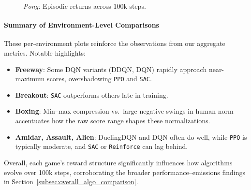 \begin{figure} 
	\centering
	\quad
	\caption{\emph{Pong:} Episodic returns across 100k steps.}
	\label{fig:pong_comparison_combined}
\end{figure}

\paragraph{Summary of Environment-Level Comparisons}
These per-environment plots reinforce the observations from our aggregate metrics.
Notable highlights:
\begin{itemize}
	\item \textbf{Freeway}: Some DQN variants (DDQN, DQN) rapidly approach near-maximum 
	scores, overshadowing \texttt{PPO} and \texttt{SAC}.
	\item \textbf{Breakout}: \texttt{SAC} outperforms others late in training.
	\item \textbf{Boxing}: Min--max compression vs.\ large negative swings in human norm 
	accentuates how the raw score range shapes these normalizations.
	\item \textbf{Amidar, Assault, Alien}: DuelingDQN and DQN often do well, 
	while \texttt{PPO} is typically moderate, and \texttt{SAC} or \texttt{Reinforce} 
	can lag behind.
\end{itemize}
Overall, each game's reward structure significantly influences how algorithms evolve 
over 100k steps, corroborating the broader performance–emissions findings in 
Section~\ref{subsec:overall_algo_comparison}.

